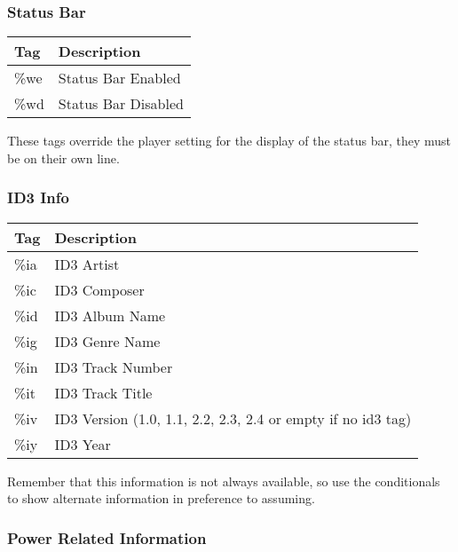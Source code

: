 \subsubsection{Status Bar}
\begin{tabularx}{\textwidth}{lX}\toprule
\textbf{Tag} & \textbf{Description}\\\midrule
\%we & Status Bar Enabled\\
\%wd & Status Bar Disabled\\\bottomrule
\end{tabularx}
\newline
\newline
These tags override the player setting for the display of the status bar, they must be on their own line.

\subsubsection{ID3 Info}

  \begin{tabularx}{\textwidth}{lX}\toprule
    \textbf{Tag} & \textbf{Description}\\\midrule
    \%ia & ID3 Artist\\
    \%ic & ID3 Composer\\
    \%id & ID3 Album Name\\
    \%ig & ID3 Genre Name\\
    \%in & ID3 Track Number\\
    \%it & ID3 Track Title\\
    \%iv & ID3 Version (1.0, 1.1, 2.2, 2.3, 2.4 or empty if no id3 tag)\\
    \%iy & ID3 Year\\\bottomrule
  \end{tabularx}
\newline
\newline
Remember that this information is not always available, so use the conditionals to show alternate information in preference to assuming.

\subsubsection{Power Related Information}

